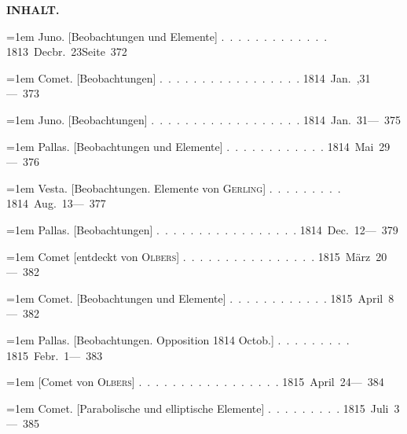 \clearpage
{}
\noindent\makebox[10mm][l]{}%
\parbox[b]{\dimexpr\textwidth-20mm\relax}{\centering\small\textbf{INHALT.}}%
\par\nobreak\medskip
\begingroup
\raggedright
\noindent\hangindent=1em Juno. [Beobachtungen und Elemente] \mbox{.\ .\ .\ .\ .\ .\ .\ .\ .\ .\ .\ .\ .} \hfill\mbox{1813 Decbr. 23}\quad\mbox{Seite 372}\par\smallskip
\noindent\hangindent=1em Comet. [Beobachtungen] \mbox{.\ .\ .\ .\ .\ .\ .\ .\ .\ .\ .\ .\ .\ .\ .\ .\ .} \hfill\mbox{1814 Jan. ,31}\quad\mbox{--- 373}\par\smallskip
\noindent\hangindent=1em Juno. [Beobachtungen] \mbox{.\ .\ .\ .\ .\ .\ .\ .\ .\ .\ .\ .\ .\ .\ .\ .\ .\ .} \hfill\mbox{1814 Jan. 31}\quad\mbox{--- 375}\par\smallskip
\noindent\hangindent=1em Pallas. [Beobachtungen und Elemente] \mbox{.\ .\ .\ .\ .\ .\ .\ .\ .\ .\ .\ .} \hfill\mbox{1814 Mai 29}\quad\mbox{--- 376}\par\smallskip
\noindent\hangindent=1em Vesta. [Beobachtungen. Elemente von \textsc{Gerling}] \mbox{.\ .\ .\ .\ .\ .\ .\ .\ .} \hfill\mbox{1814 Aug. 13}\quad\mbox{--- 377}\par\smallskip
\noindent\hangindent=1em Pallas. [Beobachtungen] \mbox{.\ .\ .\ .\ .\ .\ .\ .\ .\ .\ .\ .\ .\ .\ .\ .\ .} \hfill\mbox{1814 Dec. 12}\quad\mbox{--- 379}\par\smallskip
\noindent\hangindent=1em Comet [entdeckt von \textsc{Olbers}] \mbox{.\ .\ .\ .\ .\ .\ .\ .\ .\ .\ .\ .\ .\ .\ .\ .} \hfill\mbox{1815 März 20}\quad\mbox{--- 382}\par\smallskip
\noindent\hangindent=1em Comet. [Beobachtungen und Elemente] \mbox{.\ .\ .\ .\ .\ .\ .\ .\ .\ .\ .\ .} \hfill\mbox{1815 April 8}\quad\mbox{--- 382}\par\smallskip
\noindent\hangindent=1em Pallas. [Beobachtungen. Opposition 1814 Octob.] \mbox{.\ .\ .\ .\ .\ .\ .\ .\ .} \hfill\mbox{1815 Febr. 1}\quad\mbox{--- 383}\par\smallskip
\noindent\hangindent=1em \hspace{1em}[Comet von \textsc{Olbers}] \mbox{.\ .\ .\ .\ .\ .\ .\ .\ .\ .\ .\ .\ .\ .\ .\ .\ .} \hfill\mbox{1815 April 24}\quad\mbox{--- 384}\par\smallskip
\noindent\hangindent=1em Comet. [Parabolische und elliptische Elemente] \mbox{.\ .\ .\ .\ .\ .\ .\ .\ .} \hfill\mbox{1815 Juli 3}\quad\mbox{--- 385}\par\smallskip
